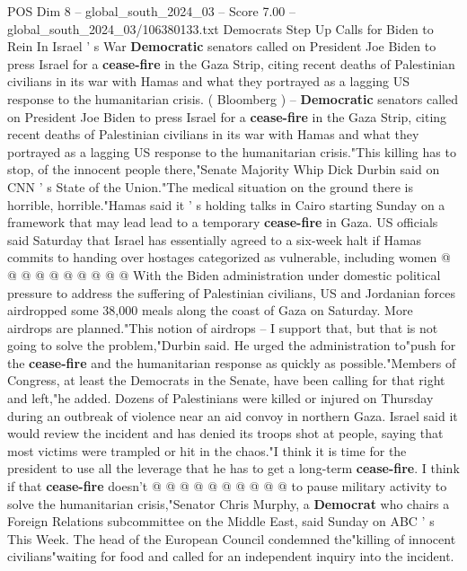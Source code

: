 \begin{textsample}{POS Dim 8 – global\_south\_2024\_03 – Score 7.00 – global\_south\_2024\_03/106380133.txt}  \label{ex:f8_pos_096}
Democrats Step Up Calls for Biden to Rein In Israel ' s War \textbf{Democratic} senators called on President Joe Biden to press Israel for a \textbf{cease-fire} in the Gaza Strip, citing recent deaths of Palestinian civilians in its war with Hamas and what they portrayed as a lagging US response to the humanitarian crisis. ( Bloomberg ) -- \textbf{Democratic} senators called on President Joe Biden to press Israel for a \textbf{cease-fire} in the Gaza Strip, citing recent deaths of Palestinian civilians in its war with Hamas and what they portrayed as a lagging US response to the humanitarian crisis."This killing has to stop, of the innocent people there,"Senate Majority Whip Dick Durbin said on CNN ' s State of the Union."The medical situation on the ground there is horrible, horrible."Hamas said it ' s holding talks in Cairo starting Sunday on a framework that may lead lead to a temporary \textbf{cease-fire} in Gaza.
US officials said Saturday that Israel has essentially agreed to a six-week halt if Hamas commits to handing over hostages categorized as vulnerable, including women @ @ @ @ @ @ @ @ @ @ With the Biden administration under domestic political pressure to address the suffering of Palestinian civilians, US and Jordanian forces airdropped some 38,000 meals along the coast of Gaza on Saturday.
More airdrops are planned."This notion of airdrops -- I support that, but that is not going to solve the problem,"Durbin said.
He urged the administration to"push for the \textbf{cease-fire} and the humanitarian response as quickly as possible."Members of Congress, at least the Democrats in the Senate, have been calling for that right and left,"he added.
Dozens of Palestinians were killed or injured on Thursday during an outbreak of violence near an aid convoy in northern Gaza.
Israel said it would review the incident and has denied its troops shot at people, saying that most victims were trampled or hit in the chaos."I think it is time for the president to use all the leverage that he has to get a long-term \textbf{cease-fire}.
I think if that \textbf{cease-fire} doesn't @ @ @ @ @ @ @ @ @ @ to pause military activity to solve the humanitarian crisis,"Senator Chris Murphy, a \textbf{Democrat} who chairs a Foreign Relations subcommittee on the Middle East, said Sunday on ABC ' s This Week.
The head of the European Council condemned the"killing of innocent civilians"waiting for food and called for an independent inquiry into the incident.

\end{textsample}
